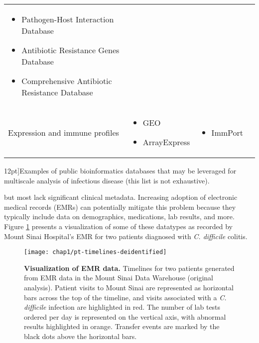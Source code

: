 \begin{table*}[ht]
\begin{tabular}{p{3.5cm} l l l}
    \begin{minipage}[t]{3.5cm}
      \raggedright
      \begin{itemize}[noitemsep]
      \item Pathogen-Host Interaction Database 
      \item Antibiotic Resistance Genes Database
      \item Comprehensive Antibiotic Resistance Database
      \end{itemize}
      \smallskip
    \end{minipage} &
    \\
    Expression and immune profiles &
    \begin{minipage}[t]{3.5cm}
      \raggedright
      \begin{itemize}[noitemsep]
      \item GEO
      \item ArrayExpress
      \end{itemize}
    \end{minipage} &
    \begin{minipage}[t]{3.5cm}
      \raggedright
      \begin{itemize}[noitemsep]
      \item ImmPort
      \end{itemize}
    \end{minipage} &
    \\
    \bottomrule
  \end{tabular}
  \caption[Bioinformatics databases for infectious diseases][12pt]{Examples of public bioinformatics databases that may be leveraged for multiscale analysis of infectious disease (this list is not exhaustive).}
  \label{tab:id_bioinf_dbs}
\end{table*}
but most lack significant clinical metadata. Increasing adoption of electronic medical records (EMRs) can potentially mitigate this problem because they typically include data on demographics, medications, lab results, and more. Figure \ref{fig:emr_sample_viz} presents a visualization of some of these datatypes as recorded by Mount Sinai Hospital’s EMR for two patients diagnosed with \textit{C. difficile} colitis.
\begin{figure}[htb]
  \texttt{[image: chap1/pt-timelines-deidentified]}               
  \caption[Visualization of EMR data]{\textbf{Visualization of EMR data.} Timelines for two patients generated from EMR data in the Mount Sinai Data Warehouse (original analysis). Patient visits to Mount Sinai are represented as horizontal bars across the top of the timeline, and visits associated with a \textit{C. difficile} infection are highlighted in red.  The number of lab tests ordered per day is represented on the vertical axis, with abnormal results highlighted in orange.  Transfer events are marked by the black dots above the horizontal bars.}
  \label{fig:emr_sample_viz}
\end{figure}
